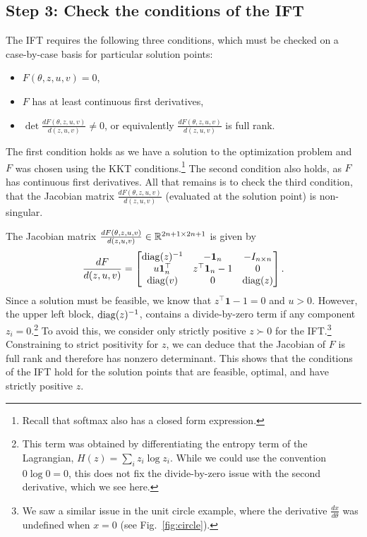 \documentclass[11pt]{article}
\begin{document}
\subsection*{Step 3: Check the conditions of the IFT}
The IFT requires the following three conditions,
which must be checked on a case-by-case basis for particular
solution points:
\begin{itemize}
    \item $F(\theta,z,u,v) = 0$,
    \item $F$ has at least continuous first derivatives,
    \item $\det\frac{dF(\theta,z,u,v)}{d(z,u,v)} \ne 0$,
        or equivalently $\frac{dF(\theta,z,u,v)}{d(z,u,v)}$
        is full rank.
\end{itemize}
The first condition holds as we have a solution to the optimization problem
and $F$ was chosen using the KKT conditions.\footnote{
Recall that softmax also has a closed form expression.}
The second condition also holds, as $F$ has continuous first derivatives.
All that remains is to check the third condition,
that the Jacobian matrix $\frac{dF(\theta,z,u,v)}{d(z,u,v)}$
(evaluated at the solution point) is non-singular.

The Jacobian matrix $\frac{dF(\theta,z,u,v)}{d(z,u,v)}\in\mathbb{R}^{2n+1\times 2n+1}$ is given by
\begin{equation}
\label{eqn:f-jac}
\frac{dF}{d(z,u,v)}=
\begin{bmatrix}
\mathrm{diag}(z)^{-1} & -\mathbf{1}_n & -I_{n\times n} \\
u\mathbf{1}_n^\top & z^\top\mathbf{1}_n - 1 & 0\\
\mathrm{diag}(v) & 0 & \mathrm{diag}(z)
\end{bmatrix}.
\end{equation}
Since a solution must be feasible, we know that $z^\top\mathbf{1}-1=0$ and $u > 0$.
However, the upper left block, $\mathrm{diag}(z)^{-1}$, contains a divide-by-zero term if
any component $z_i = 0$.\footnote{
This term was obtained by differentiating the entropy
term of the Lagrangian, $H(z) = \sum_i z_i\log z_i$.
While we could use the convention $0\log 0 = 0$,
this does not fix the divide-by-zero issue with the second derivative, which we see here.
}
To avoid this, we consider only strictly positive $z \succ 0$ for the IFT.\footnote{
We saw a similar issue in the unit circle example, where the derivative
$\frac{dx}{d\theta}$ was undefined when $x=0$ (see Fig.~\ref{fig:circle}).
}
Constraining to strict positivity for $z$,
we can deduce that the Jacobian of $F$ is full rank and therefore has nonzero determinant.
This shows that the conditions of the IFT hold for the solution points that are
feasible, optimal, and have strictly positive $z$.
\end{document}
